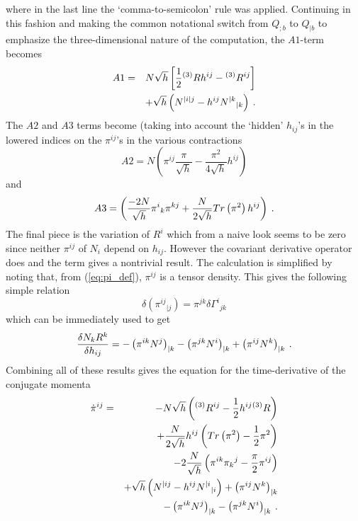 where in the last line the `comma-to-semicolon' rule was applied.
Continuing in this fashion and making the common notational switch
from $Q_{;b}$ to $Q_{|b}$ to emphasize the three-dimensional
nature of the computation, the $A1$-term becomes
\begin{eqnarray*}
   A1 & = & N \sqrt{h} \left[ \frac{1}{2} {}^{(3)}R h^{ij} - {}^{(3)}R^{ij} \right] \\
      &   &  + \sqrt{h} \left( N^{|i|j} - h^{ij} {N^{|k}}_{|k} \right) \: .
\end{eqnarray*}
The $A2$ and $A3$ terms become (taking into account the `hidden' $h_{ij}$'s in
the lowered indices on the $\pi^{ij}$'s in the various contractions
\[
   A2 = N \left( \pi^{ij} \frac{\pi}{\sqrt{h}} - \frac{\pi^2}{4 \sqrt{h}} h^{ij}
          \right)
\]
and
\[
   A3 = \left(
               \frac{-2 N}{\sqrt{h}} {\pi^i}_{k} \pi^{kj} +
               \frac{N}{2 \sqrt{h}}  Tr\left( \pi^2 \right) h^{ij}
        \right) \: .
\]
The final piece is the variation of $R^i$ which from a naive look seems to be
zero since neither $\pi^{ij}$ of $N_{i}$ depend on $h_{ij}$.  However the
covariant derivative operator does and the term gives a nontrivial result.
The calculation is simplified by noting that, from (\ref{eq:pi_def}), $\pi^{ij}$
is a tensor density.
This gives the following simple relation
\[
   \delta \left( {\pi^{ij}}_{|j} \right)= \pi^{jk} \delta {\Gamma^i}_{jk}
\]
which can be immediately used to get
\[
    \frac{\delta N_k R^k}{\delta h_{ij}}
= - \left( \pi^{ik} N^j \right)_{|k}
  - \left( \pi^{jk} N^i \right)_{|k}
  + \left( \pi^{ij} N^k \right)_{|k} \: .
\]
Combining all of these results gives the equation for the time-derivative of
the conjugate momenta
\begin{eqnarray*}
{\dot \pi}^{ij} & = &
  - N \sqrt{h} \left( {}^{(3)}R^{ij} - \frac{1}{2} h^{ij} {}^{(3)}R \right) \\
  & &
  + \frac{N}{2\sqrt{h}} h^{ij} \left(
                                      Tr\left( \pi^2\right) - \frac{1}{2} \pi^2
                               \right) \\
  & &
  - 2 \frac{N}{\sqrt{h}} \left(
                                \pi^{ik}{\pi_k}^j - \frac{\pi}{2} \pi^{ij}
                         \right) \\
  & &
  + \sqrt{h} \left( N^{|ij} - h^{ij} {N^{|i}}_{|i} \right)
  + \left( \pi^{ij} N^k \right)_{|k} \\
  & &
  - \left( \pi^{ik} N^j \right)_{|k}
  - \left( \pi^{jk} N^i \right)_{|k} \: .
\end{eqnarray*}


